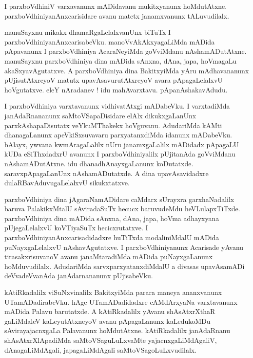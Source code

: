 \documentclass{article}
\begin{document}
\begin{mn}%
I parxboVdhiniV varxavanunx mADidavanu mukitxyanunx hoMdutAtxne. parxboVdhiniyanAnxcarisidare avanu 
matetx janamxvanunx tALuvudilalx.
\end{mn}

\begin{mn}%
manuSayxnu mikakx dhamaRgaLelalxvanUnx biTuTx I parxboVdhiniyanAnxcarisabeVku. manoVvAkAkxyagaLiMda 
mADida pApavanunx I parxboVdhiniya AcaraNeyiMda goVviMdanu nAshamADutAtxne. manuSayxnu 
parxboVdhiniya dina mADida sAnxna, dAna, japa, hoVmagaLu akaSxyavAgutatxve. A parxboVdhiniya dina 
BakitxyiMda yAru mAdhavananunx pUjisutAtxreyoV matutx upavAsavurutAtxreyoV avara pApagaLelalxvU 
hoVgutatxve. eleY nAradanev ! idu mahAvarxtavu. pApanAshakavAdudu.
\end{mn}

\begin{mn}%
I parxboVdhiniya varxtavanunx vidhivatAtxgi mADabeVku. I varxtadiMda janAdaRnananunx 
saMtoVSapaDisidare elAlx dikukxgaLanUnx parxkAshapaDisutatx veYkuMThakekx hoVguvanu. AdudariMda 
kAMti dhanagaLanunx apeVkiSxsuvavaru parxyatanxdiMda idanunx mADabeVku. bAlayx, ywvana 
kwmAragaLalilx nUru janamxgaLalilx mADidadx pApagaLU kUDa eSiThxdadxrU avanunx I 
parxboVdhiniyalilx pUjitanAda goVviMdanu nAshamADutAtxne. idu dhanadhAnayxgaLanunx koDutatxde. 
saravxpApagaLanUnx nAshamADutatxde. A dina upavAsavidadxre dulaRBavAduvugaLelalxvU sikukxtatxve.
\end{mn}

\begin{mn}%
parxboVdhiniya dina jAgaraNamADidare caMdarx sUrayxra garxhaNadalilx baruva PalakikxMtalU 
sAviradaSuTx hecucx baruvudeMdu heVLulapxTiTxde. parxboVdhiniya dina mADida sAnxna, dAna, japa, 
hoVma adhayxyana pUjegaLelalxvU koVTiyaSuTx hecicxrutatxve. I parxboVdhiniyanAnxcarisadidadxre 
huTiTxda modaliniMdalU mADida puNayxgaLelalxvU nAshavAgutatxve. I parxboVdhiniyanunx Acarisade 
yAvanu tirasakxrisuvanoV avanu janaMtaradiMda mADida puNayxgaLanunx hoMduvudilalx. AdudariMda 
sarvxparxyatanxdiMdalU a divasas upavAsamADi deVvadeVvanAda janAdarnananunx pUjisabeVku.
\end{mn}

\begin{mn}%
kAtiRkadalilx viSuNxvinalilx BakitxyiMda parara maneya ananxvanunx UTamADadirabeVku. hAge 
UTamADadidadxre cAMdArxyaNa varxtavanunx mADida Palavu barutatxde. A kAtiRkadalilx yAvanu 
shAsAtxrXthaR gaLiMdaleV kaLeyutAtxneyoV avanu pApagaLanunx kaLedukoMDu sAvirayajacnxgaLa 
Palavanunx hoMdutAtxne. kAtiRkadalilx janAdaRnanu shAsAtxrXlApadiMda saMtoVSaguLuLxvaMte 
yajacnxgaLiMdAgaliV, dAnagaLiMdAgali, japagaLiMdAgali saMtoVSagoLuLxvudilalx.
\end{mn}
\end{document}
